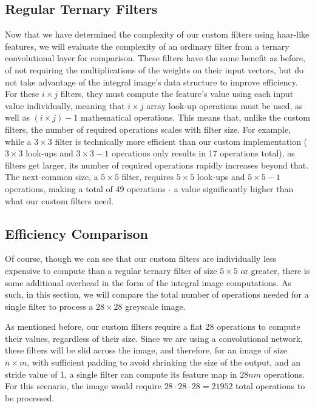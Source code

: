 \documentclass[11pt,a4paper,oldfontcommands]{memoir}
\begin{document}
\subsection{Regular Ternary Filters}
Now that we have determined the complexity of our custom filters using haar-like features, we will evaluate the complexity of an ordinary filter from a ternary convolutional layer for comparison. These filters have the same benefit as before, of not requiring the multiplications of the weights on their input vectors, but do not take advantage of the integral image's data structure to improve efficiency. For these $i \times j$ filters, they must compute the feature's value using each input value individually, meaning that $i \times j$ array look-up operations must be used, as well as $(i \times j) - 1$ mathematical operations. This means that, unlike the custom filters, the number of required operations scales with filter size. For example, while a $3 \times 3$ filter is technically more efficient than our custom implementation ($3 \times 3$ look-ups and $3 \times 3 - 1$ operations only results in 17 operations total), as filters get larger, its number of required operations rapidly increases beyond that. The next common size, a $5 \times 5$ filter, requires $5 \times 5$ look-ups and $5 \times 5 - 1$ operations, making a total of 49 operations - a value significantly higher than what our custom filters need.

\subsection{Efficiency Comparison}
\label{ss:efficiency_comp}
Of course, though we can see that our custom filters are individually less expensive to compute than a regular ternary filter of size $5 \times 5$ or greater, there is some additional overhead in the form of the integral image computations. As such, in this section, we will compare the total number of operations needed for a single filter to process a $28 \times 28$ greyscale image.

As mentioned before, our custom filters require a flat 28 operations to compute their values, regardless of their size. Since we are using a convolutional network, these filters will be slid across the image, and therefore, for an image of size $n \times m$, with sufficient padding to avoid shrinking the size of the output, and an stride value of 1, a single filter can compute its feature map in $28nm$ operations. For this scenario, the image would require $28\cdot 28 \cdot 28 = 21952$ total operations to be processed.
\end{document}
